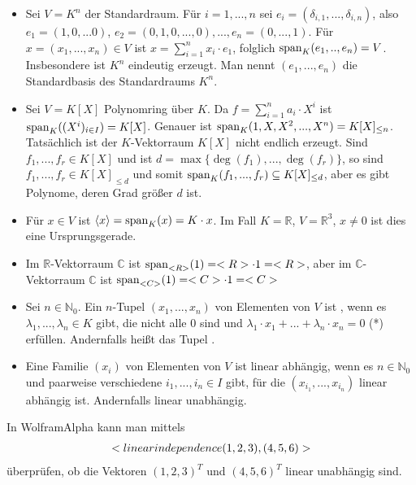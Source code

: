 \begin{example}
	\begin{itemize}
		\item Sei $V=K^n$ der Standardraum. Für $i=1,...,n$ sei $e_i=(\delta_{i,1},...,\delta_{i,n})$, also $e_1=(1,0,...0)$, 
		$e_2=(0,1,0,...,0),...,e_n=(0,...,1)$. Für $x=(x_1,...,x_n) \in V$ ist $x=\sum_{i=1}^n x_i\cdot e_1$, folglich 
		$\Span_K(e_1,..,e_n)=V$. Insbesondere ist $K^n$ eindeutig erzeugt. Man nennt $(e_1,...,e_n)$ die Standardbasis des 
		Standardraums $K^n$.
		\item Sei $V=K[X]$ Polynomring über $K$. Da $f=\sum_{i=1}^n a_i\cdot X^i$ ist $\Span_K((X^i)_{i \in I})=K[X]$. 
		Genauer ist $\Span_K(1,X,X^2,...,X^n)=K[X]_{\le n}$. Tatsächlich ist der $K$-Vektorraum $K[X]$ nicht endlich erzeugt. Sind 
		$f_1,...,f_r \in K[X]$ und ist $d=\max\{\deg(f_1),...,\deg(f_r)\}$, so sind $f_1,...,f_r \in K[X]_{\le d}$ und somit 
		$\Span_K(f_1,...,f_r) \subseteq K[X]_{\le d}$, aber es gibt Polynome, deren Grad größer $d$ ist.
		\item Für $x \in V$ ist $\langle x\rangle=\Span_K(x)=K\cdot x$. Im Fall $K=\mathbb R$, $V=\mathbb R^3$, $x\neq 0$ ist dies eine 
		Ursprungsgerade.
		\item Im $\mathbb R$-Vektorraum $\mathbb C$ ist $\Span_{\mathbb R}(1)=\mathbb R\cdot 1=\mathbb R$, aber im $\mathbb C$-Vektorraum 
		$\mathbb C$ ist $\Span_{\mathbb C}(1)=\mathbb C\cdot 1=\mathbb C$
	\end{itemize}
\end{example}

\begin{definition}
	\begin{itemize}
		\item Sei $n\in \mathbb N_0$. Ein $n$-Tupel $(x_1,...,x_n)$ von Elementen von $V$ ist , wenn es 
		$\lambda_1,...,\lambda_n \in K$ gibt, die nicht alle 0 sind und $\lambda_1\cdot x_1+...+\lambda_n\cdot x_n=0$ (*) 
		erfüllen. Andernfalls heißt das Tupel .
		\item Eine Familie $(x_i)$ von Elementen von $V$ ist linear abhängig, wenn es $n\in \mathbb N_0$ und paarweise 
		verschiedene $i_1,...,i_n \in I$ gibt, für die $(x_{i_1},...,x_{i_n})$ linear abhängig ist. Andernfalls linear 
		unabhängig.
	\end{itemize}
\end{definition}

\begin{mathematica}
	In WolframAlpha kann man mittels 
	\begin{align}
		\texttt{linear independence (1,2,3), (4,5,6)}\notag
	\end{align}
	überprüfen, ob die Vektoren $(1,2,3)^T$ und $(4,5,6)^T$ linear unabhängig sind.
\end{mathematica}

